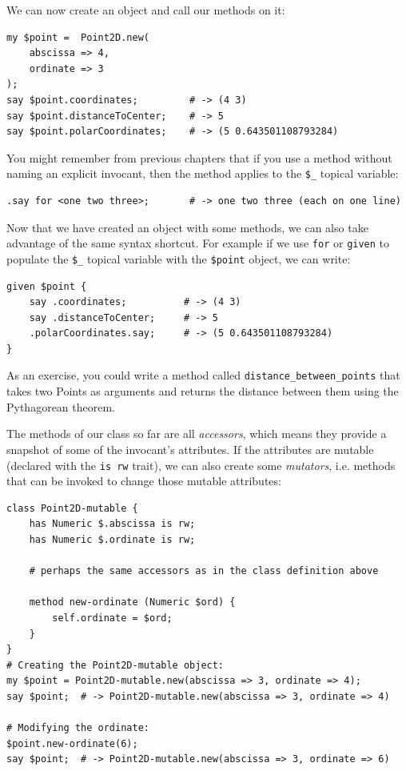 We can now create an object and call our methods on it:

\begin{verbatim}
my $point =  Point2D.new(
    abscissa => 4, 
    ordinate => 3
);
say $point.coordinates;         # -> (4 3)
say $point.distanceToCenter;    # -> 5
say $point.polarCoordinates;    # -> (5 0.643501108793284)
\end{verbatim}

You might remember from previous chapters that if you use a method 
without naming an explicit invocant, then the method applies to 
the \verb'$_' topical variable:

\begin{verbatim}
.say for <one two three>;       # -> one two three (each on one line)
\end{verbatim}

Now that we have created an object with some methods, we can also 
take advantage of the same syntax shortcut. For example if we 
use {\tt for} or {\tt given} to populate the \verb'$_' topical 
variable with the \verb'$point' object, we can write:

\begin{verbatim}
given $point {
    say .coordinates;          # -> (4 3)                       
    say .distanceToCenter;     # -> 5                 
    .polarCoordinates.say;     # -> (5 0.643501108793284)
}    
\end{verbatim}

As an exercise, you could write a method called 
\verb"distance_between_points" that takes two Points 
as arguments and returns the distance between
them using the Pythagorean theorem.

The methods of our class so far are all \emph{accessors}, which 
means they provide a snapshot of some of the invocant's attributes. 
If the attributes are mutable (declared with the \verb'is rw' 
trait), we can also create some \emph{mutators}, i.e. methods 
that can be invoked to change those mutable attributes:

\begin{verbatim}
class Point2D-mutable {
    has Numeric $.abscissa is rw;
    has Numeric $.ordinate is rw;
    
    # perhaps the same accessors as in the class definition above
    
    method new-ordinate (Numeric $ord) {
        self.ordinate = $ord; 
    }
}
# Creating the Point2D-mutable object:
my $point = Point2D-mutable.new(abscissa => 3, ordinate => 4);
say $point;  # -> Point2D-mutable.new(abscissa => 3, ordinate => 4)

# Modifying the ordinate:
$point.new-ordinate(6);
say $point;  # -> Point2D-mutable.new(abscissa => 3, ordinate => 6)
\end{verbatim}




